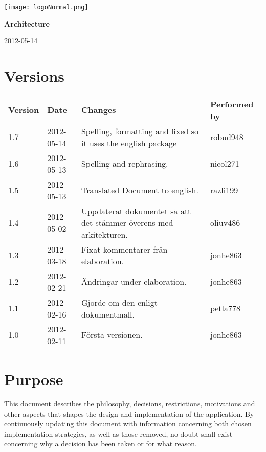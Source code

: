\documentclass[a4paper, 12pt, titlepage]{article}
\begin{document}
	\setcounter{changebargrey}{70} %
	
	\begin{titlepage}

		\texttt{[image: logoNormal.png]}
		
		\vspace{6cm}
		
		\begin{center}
			\Huge{\textbf{Architecture}}
			
			\vspace{0.5cm}
			
			\huge{2012-05-14} %
		\end{center}
		
	\end{titlepage}
	
	

	\tableofcontents
	\newpage

	
	\section*{Versions}
	\begin{tabularx}{1\textwidth}{|l|l|X|l|}
		\hline
		\bf{Version} & \bf{Date} & \bf{Changes} & \bf{Performed by} \\
		\hline
		1.7 & 2012-05-14 & Spelling, formatting and fixed so it uses the english package & robud948 \\
		\hline
		1.6 & 2012-05-13 & Spelling and rephrasing. & nicol271 \\
		\hline
		1.5 & 2012-05-13 & Translated Document to english. & razli199 \\
		\hline
		1.4 & 2012-05-02 & Uppdaterat dokumentet så att det stämmer överens med arkitekturen. & oliuv486 \\
		\hline
		1.3 & 2012-03-18 & Fixat kommentarer från elaboration. & jonhe863 \\
		\hline
		1.2 & 2012-02-21 & Ändringar under elaboration. & jonhe863 \\	
		\hline
		1.1 & 2012-02-16 & Gjorde om den enligt dokumentmall. & petla778 \\
		\hline
		1.0 & 2012-02-11 & Första versionen. & jonhe863 \\
		\hline
	\end{tabularx}
	\newpage
	

\section{Purpose}
This document describes the philosophy, decisions, restrictions, motivations and other aspects that shapes the design and implementation of the application. By continuously updating this document with information concerning both chosen implementation strategies, as well as those removed, no doubt shall exist concerning why a decision has been taken or for what reason.
\end{document}
